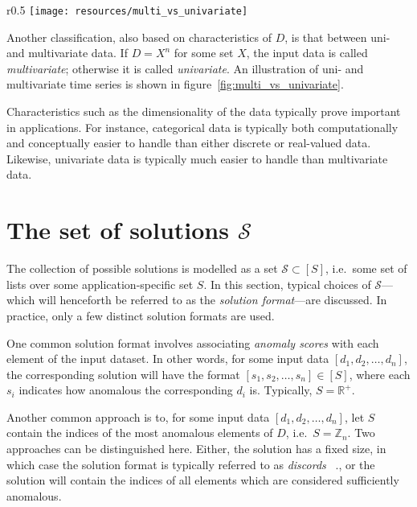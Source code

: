 \begin{wrapfigure}{r}{0.5\textwidth}
\changecaptionwidth
{}
\texttt{[image: resources/multi\_vs\_univariate]}
\caption[derp]{Two sine curves regarded as two separate univariate time series (dotted lines) and as one multivariate time series (solid lines).}
\label{fig:multi_vs_univariate}
\end{wrapfigure}

Another classification, also based on characteristics of $D$, is that between uni- and multivariate data. If $D = X^n$ for some set $X$, the input data is called \emph{multivariate}; otherwise it is called \emph{univariate}. An illustration of uni- and multivariate time series is shown in figure~\ref{fig:multi_vs_univariate}.

Characteristics such as the dimensionality of the data typically prove important in applications. For instance, categorical data is typically both computationally and conceptually easier to handle than either discrete or real-valued data. Likewise, univariate data is typically much easier to handle than multivariate data.

\section{The set of solutions $\mathcal{S}$}

The collection of possible solutions is modelled as a set $\mathcal{S} \subset [S]$, i.e.\ some set of lists over some application-specific set $S$. In this section, typical choices of $\mathcal{S}$---which will henceforth be referred to as the \emph{solution format}---are discussed. In practice, only a few distinct solution formats are used.

One common solution format involves associating \emph{anomaly scores} with each element of the input dataset. In other words, for some input data $[d_1, d_2, \dots, d_n]$, the corresponding solution will have the format $[s_1, s_2, \dots, s_n] \in [S]$, where each $s_i$ indicates how anomalous the corresponding $d_i$ is. Typically,  $S = \mathbb{R}^+$.

Another common approach is to, for some input data $[d_1, d_2, \dots, d_n]$, let $S$ contain the indices of the most anomalous elements of $D$, i.e.\ $S = \mathbb{Z}_n$. Two approaches can be distinguished here. Either, the solution has a fixed size, in which case the solution format is typically referred to as \emph{discords}~\cite{keogh1} \cite{bu} \cite{yankov} \cite{fu} \cite{lin}., or the solution will contain the indices of all elements which are considered sufficiently anomalous.

